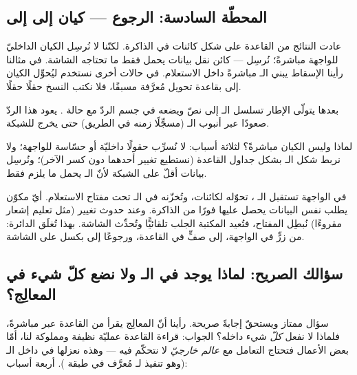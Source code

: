 \subsection{المحطّة السادسة: الرجوع — كيان إلى  إلى }

عادت النتائج من القاعدة على شكل كائنات في الذاكرة. لكنّنا لا نُرسِل الكيان
 الداخليّ للواجهة مباشرةً؛ نُرسِل  — كائن نقل بيانات يحمل فقط ما
تحتاجه الشاشة. في مثالنا رأينا الإسقاط 
يبني الـ  مباشرةً داخل الاستعلام. في حالات أخرى نستخدم  ليُحوِّل
الكيان إلى  بقاعدة تحويل مُعرَّفة مسبقًا، فلا نكتب النسخ حقلًا حقلًا.

بعدها يتولّى الإطار تسلسل الـ  إلى نصّ  ويضعه في جسم الردّ مع حالة
. يعود هذا الردّ صعودًا عبر أنبوب الـ  (مسجِّلًا زمنه في
الطريق) حتى يخرج للشبكة.

\begin{why}
لماذا  وليس الكيان مباشرةً؟ لثلاثة أسباب: لا نُسرِّب حقولًا داخليّة أو حسّاسة
للواجهة؛ ولا نربط شكل الـ  بشكل جداول القاعدة (نستطيع تغيير أحدهما دون كسر
الآخر)؛ ونُرسِل بيانات أقلّ على الشبكة لأنّ الـ  يحمل ما يلزم فقط.
\end{why}

في الواجهة تستقبل  الـ ، تحوّله لكائنات، وتُخزّنه في
الـ  تحت مفتاح الاستعلام. أيّ مكوّن يطلب نفس البيانات يحصل عليها فورًا من
الذاكرة. وعند حدوث تغيير (مثل تعليم إشعار مقروءًا) نُبطِل  المفتاح،
فتُعيد المكتبة الجلب تلقائيًّا وتُحدِّث الشاشة. بهذا تُغلَق الدائرة: من زرٍّ في الواجهة،
إلى صفٍّ في القاعدة، ورجوعًا إلى بكسل على الشاشة.

\subsection{سؤالك الصريح: لماذا يوجد  في الـ  ولا نضع كلّ شيء في المعالِج؟}

سؤال ممتاز ويستحقّ إجابةً صريحة. رأينا أنّ المعالِج يقرأ من القاعدة عبر 
مباشرةً، فلماذا لا نفعل \emph{كلّ} شيء داخله؟ الجواب: قراءة القاعدة عمليّة نظيفة
ومملوكة لنا، أمّا بعض الأعمال فتحتاج التعامل مع \emph{عالم خارجيّ} لا نتحكّم فيه —
وهذه نعزلها في  داخل الـ  (وهو تنفيذ لـ 
مُعرَّف في طبقة ). أربعة أسباب:

